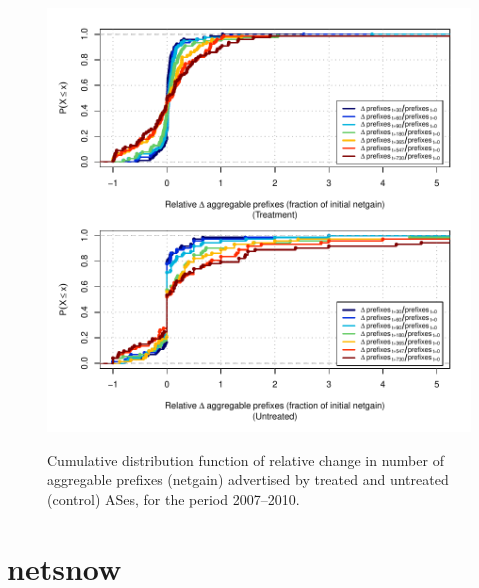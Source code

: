 \begin{figure}[H]
\begin{centering}
\begin{singlespace}
    \includegraphics[width=6in]{figures/behavior-rel_netgain-2007_2010-corr.pdf}
    \vspace{-2em}\\
    \caption{Cumulative distribution function of relative change in number of
    aggregable prefixes (netgain) advertised by treated and untreated (control)
    ASes, for the period 2007--2010.}
\end{singlespace}
\end{centering}
\end{figure}

\section{netsnow}

